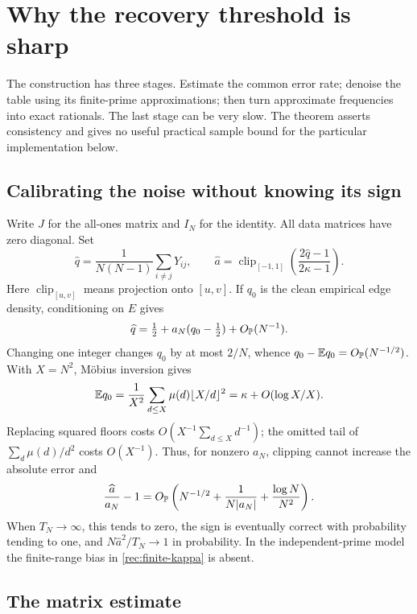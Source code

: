 
\section{Why the recovery threshold is sharp}\label{rec:threshold-proof}

The construction has three stages. Estimate the common error rate;
denoise the table using its finite-prime approximations; then turn
approximate frequencies into exact rationals. The last stage can be
very slow. The theorem asserts consistency and gives no useful practical
sample bound for the particular implementation below.

\subsection{Calibrating the noise without knowing its sign}

Write $J$ for the all-ones matrix and $I_N$ for the identity. All data
matrices have zero diagonal. Set
\[
 \widehat q=\frac1{N(N-1)}\sum_{i\ne j}Y_{ij},\qquad
 \widehat a=\operatorname{clip}_{[-1,1]}
 \left(\frac{2\widehat q-1}{2\kappa-1}\right).
\]
Here $\operatorname{clip}_{[u,v]}$ means projection onto $[u,v]$.
If $q_0$ is the clean empirical edge density, conditioning on $E$ gives
\[
 \widehat q=\tfrac12+a_N(q_0-\tfrac12)+O_{\mathbb P}(N^{-1}).
\]
Changing one integer changes $q_0$ by at most $2/N$, whence
$q_0-\mathbb E q_0=O_{\mathbb P}(N^{-1/2})$. With $X=N^2$, Möbius inversion gives
\begin{equation}\label{rec:finite-kappa}
 \mathbb E q_0=\frac1{X^2}\sum_{d\le X}\mu(d)\lfloor X/d\rfloor^2
 =\kappa+O(\log X/X).
\end{equation}
Replacing squared floors costs $O(X^{-1}\sum_{d\le X}d^{-1})$;
the omitted tail of $\sum_d\mu(d)/d^2$ costs $O(X^{-1})$.
Thus, for nonzero $a_N$, clipping cannot increase the absolute error and
\begin{equation}\label{rec:calibration-error}
 \frac{\widehat a}{a_N}-1
 =O_{\mathbb P}\left(N^{-1/2}+\frac1{N|a_N|}+\frac{\log N}{N^2}\right).
\end{equation}
When $T_N\to\infty$, this tends to zero, the sign is eventually correct
with probability tending to one, and $N\widehat a^2/T_N\to1$ in
probability. In the independent-prime model the finite-range bias in
\eqref{rec:finite-kappa} is absent.

\subsection{The matrix estimate}

